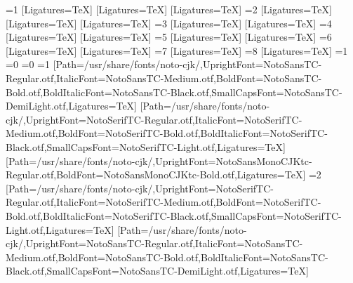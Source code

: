 \usepackage[version=4]{mhchem}
\usepackage[hidelinks,bookmarksnumbered=true,pdfstartview=FitH]{hyperref}
\usepackage{tcolorbox}
\usepackage{unicode-math}
\ifnum\value{Fonts}=1
\setmainfont{TeX Gyre Heros}[Ligatures=TeX]
\setsansfont{TeX Gyre Termes}[Ligatures=TeX]
\setmonofont{TeX Gyre Cursor}[Ligatures=TeX]
\else\ifnum\value{Fonts}=2
\setmainfont{TeX Gyre Termes}[Ligatures=TeX]
\setsansfont{TeX Gyre Heros}[Ligatures=TeX]
\setmonofont{TeX Gyre Cursor}[Ligatures=TeX]
\else\ifnum\value{Fonts}=3
\setmainfont{TeX Gyre Heros}[Ligatures=TeX]
\setmonofont{TeX Gyre Cursor}[Ligatures=TeX]
\else\ifnum\value{Fonts}=4
\setmainfont{TeX Gyre Termes}[Ligatures=TeX]
\setmonofont{TeX Gyre Cursor}[Ligatures=TeX]
\else\ifnum\value{Fonts}=5
\setmainfont{TeX Gyre Heros}[Ligatures=TeX]
\setsansfont{TeX Gyre Termes}[Ligatures=TeX]
\else\ifnum\value{Fonts}=6
\setmainfont{TeX Gyre Termes}[Ligatures=TeX]
\setsansfont{TeX Gyre Heros}[Ligatures=TeX]
\else\ifnum\value{Fonts}=7
\setmainfont{TeX Gyre Heros}[Ligatures=TeX]
\else\ifnum\value{Fonts}=8
\setmainfont{TeX Gyre Termes}[Ligatures=TeX]
\fi\fi\fi\fi\fi\fi\fi\fi
\ifnum\value{CJK}=1
\ifx\luatexversion\undefined
\ifnum\value{CJKFonts}=0\else
\ifnum\value{CJKLanguage}=0
\ifnum\value{CJKFonts}=1
[Path=/usr/share/fonts/noto-cjk/,UprightFont=NotoSansTC-Regular.otf,ItalicFont=NotoSansTC-Medium.otf,BoldFont=NotoSansTC-Bold.otf,BoldItalicFont=NotoSansTC-Black.otf,SmallCapsFont=NotoSansTC-DemiLight.otf,Ligatures=TeX]
[Path=/usr/share/fonts/noto-cjk/,UprightFont=NotoSerifTC-Regular.otf,ItalicFont=NotoSerifTC-Medium.otf,BoldFont=NotoSerifTC-Bold.otf,BoldItalicFont=NotoSerifTC-Black.otf,SmallCapsFont=NotoSerifTC-Light.otf,Ligatures=TeX]
[Path=/usr/share/fonts/noto-cjk/,UprightFont=NotoSansMonoCJKtc-Regular.otf,BoldFont=NotoSansMonoCJKtc-Bold.otf,Ligatures=TeX]
\else\ifnum\value{CJKFonts}=2
[Path=/usr/share/fonts/noto-cjk/,UprightFont=NotoSerifTC-Regular.otf,ItalicFont=NotoSerifTC-Medium.otf,BoldFont=NotoSerifTC-Bold.otf,BoldItalicFont=NotoSerifTC-Black.otf,SmallCapsFont=NotoSerifTC-Light.otf,Ligatures=TeX]
[Path=/usr/share/fonts/noto-cjk/,UprightFont=NotoSansTC-Regular.otf,ItalicFont=NotoSansTC-Medium.otf,BoldFont=NotoSansTC-Bold.otf,BoldItalicFont=NotoSansTC-Black.otf,SmallCapsFont=NotoSansTC-DemiLight.otf,Ligatures=TeX]
